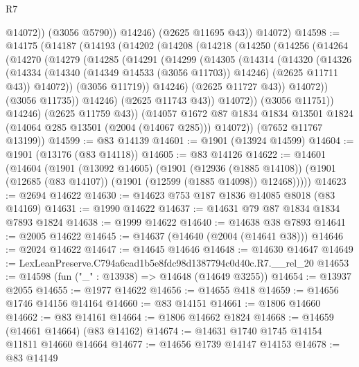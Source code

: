 \begin{lexlean}{R7}
\begin{coremodule}
                @14072))
            (@3056 @5790))
          @14246)
        (@2625 @11695 @43))
      @14072)
@14598 := @14175
    (@14187
      (@14193
        (@14202
          (@14208
            (@14218
              (@14250
                (@14256
                  (@14264
                    (@14270
                      (@14279
                        (@14285
                          (@14291
                            (@14299
                              (@14305
                                (@14314
                                  (@14320
                                    (@14326
                                      (@14334
                                        (@14340 (@14349 @14533 (@3056 @11703)) @14246)
                                        (@2625 @11711 @43))
                                      @14072))
                                  (@3056 @11719))
                                @14246)
                              (@2625 @11727 @43))
                            @14072))
                        (@3056 @11735))
                      @14246)
                    (@2625 @11743 @43))
                  @14072))
              (@3056 @11751))
            @14246)
          (@2625 @11759 @43))
        (@14057
          @1672
          @87
          @1834
          @1834
          @13501
          @1824
          (@14064 @285 @13501 (@2004 (@14067 @285)))
          @14072))
      (@7652 @11767 @13199))
@14599 := @83 @14139
@14601 := @1901 (@13924 @14599)
@14604 := @1901 (@13176 (@83 @14118))
@14605 := @83 @14126
@14622 := @14601
    (@14604
      (@1901
        (@13092 @14605)
        (@1901
          (@12936 (@1885 @14108))
          (@1901 (@12685 (@83 @14107)) (@1901 (@12599 (@1885 @14098)) @12468)))))
@14623 := @2694 @14622
@14630 := @14623 @753 @187 @1836 @14085 @8018 (@83 @14169)
@14631 := @1990 @14622
@14637 := @14631 @79 @87 @1834 @1834 @7893 @1824
@14638 := @1999 @14622
@14640 := @14638 @38 @7893
@14641 := @2005 @14622
@14645 := @14637 (@14640 (@2004 (@14641 @38)))
@14646 := @2024 @14622
@14647 := @14645 @14646
@14648 := @14630 @14647
@14649 := LexLeanPreserve.C794a6cad1b5e8fdc98d1387794c0d40c.R7.__rel_20
@14653 := @14598 (fun ("_" : @13938) => @14648 (@14649 @3255))
@14654 := @13937 @2055
@14655 := @1977 @14622
@14656 := @14655 @418
@14659 := @14656 @1746 @14156 @14164
@14660 := @83 @14151
@14661 := @1806 @14660
@14662 := @83 @14161
@14664 := @1806 @14662 @1824
@14668 := @14659 (@14661 @14664) (@83 @14162)
@14674 := @14631 @1740 @1745 @14154 @11811 @14660 @14664
@14677 := @14656 @1739 @14147 @14153
@14678 := @83 @14149

\end{coremodule}
\end{lexlean}

